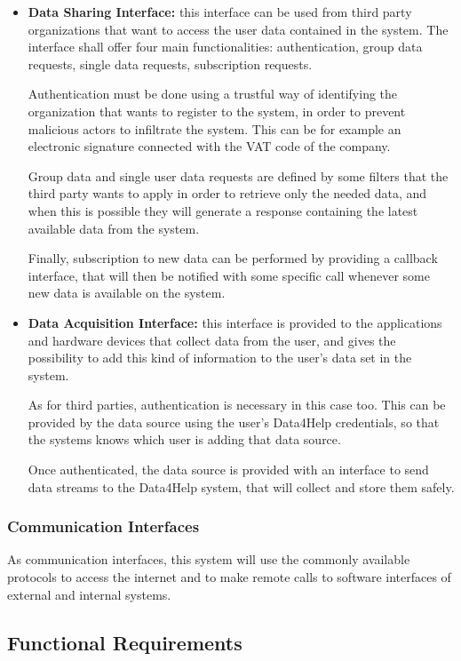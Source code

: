 \begin{itemize}
	\item \textbf{Data Sharing Interface:} this interface can be used from third party organizations that want to access the user data contained in the system.
	The interface shall offer four main functionalities: authentication, group data requests, single data requests, subscription requests.
	
	Authentication must be done using a trustful way of identifying the organization that wants to register to the system, in order to prevent malicious actors to infiltrate the system. This can be for example an electronic signature connected with the VAT code of the company.
	
	Group data and single user data requests are defined by some filters that the third party wants to apply in order to retrieve only the needed data, and when this is possible they will generate a response containing the latest available data from the system.
	
	 Finally, subscription to new data can be performed by providing a callback interface, that will then be notified with some specific call whenever some new data is available on the system.
	 
	\item \textbf{Data Acquisition Interface:} this interface is provided to the applications and hardware devices that collect data from the user, and gives the possibility to add this kind of information to the user's data set in the system.
	
	As for third parties, authentication is necessary in this case too. This can be provided by the data source using the user's Data4Help credentials, so that the systems knows which user is adding that data source.
	
	Once authenticated, the data source is provided with an interface to send data streams to the Data4Help system, that will collect and store them safely. 
\end{itemize}

\subsubsection{Communication Interfaces}
As communication interfaces, this system will use the commonly available protocols to access the internet and to make remote calls to software interfaces of external and internal systems.

\subsection{Functional Requirements}

